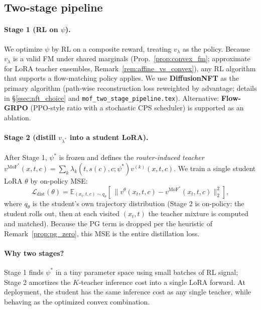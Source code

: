 \documentclass[11pt,a4paper]{article}
\newcommand{\loss}{\mathcal{L}}
\newcommand{\E}{\mathbb{E}}
\newcommand{\MoF}{\mathrm{MoF}}
\theoremstyle{definition}
\begin{document}
\subsection{Two-stage pipeline}
\label{ssec:two_stage}

\paragraph{Stage 1 (RL on $\psi$).}
We optimize $\psi$ by RL on a composite reward, treating $v_\lambda$ as
the policy. Because $v_\lambda$ is a valid FM under shared marginals
(Prop.~\ref{prop:convex_fm}; approximate for LoRA teacher ensembles,
Remark~\ref{rem:affine_vs_convex}),
any RL algorithm that supports a flow-matching policy applies. We use
\textbf{DiffusionNFT} as the primary algorithm (path-wise reconstruction
loss reweighted by advantage; details in \S\ref{ssec:nft_choice} and
\texttt{mof\_two\_stage\_pipeline.tex}). Alternative: \textbf{Flow-GRPO}
(PPO-style ratio with a stochastic CPS scheduler) is supported as an
ablation.

\paragraph{Stage 2 (distill $v_{\lambda^*}$ into a student LoRA).}
After Stage 1, $\psi^*$ is frozen and defines the
\emph{router-induced teacher}
$v^{\MoF^*}(x,t,c) = \sum_k \lambda_k(t,s(c),c;\psi^*) v^{(k)}(x,t,c)$.
We train a single student LoRA $\theta$ by on-policy MSE:
\begin{equation}
\loss_{\text{dist}}(\theta) =
\E_{(x_t,t,c)\sim q_\theta}\!\left[\,
\big\| v^\theta(x_t,t,c) - v^{\MoF^*}(x_t,t,c) \big\|_2^2
\right],
\label{eq:distill_loss}
\end{equation}
where $q_\theta$ is the student's own trajectory distribution (Stage 2 is
on-policy: the student rolls out, then at each visited
$(x_t,t)$ the teacher mixture is computed and matched). Because
the PG term is dropped per the heuristic of
Remark~\ref{prop:pg_zero}, this MSE is the entire
distillation loss.

\paragraph{Why two stages?}
Stage 1 finds $\psi^*$ in a tiny parameter space using small batches of
RL signal; Stage 2 amortizes the $K$-teacher inference cost into a single
LoRA forward. At deployment, the student has the same inference cost as
any single teacher, while behaving as the optimized convex combination.
\end{document}
